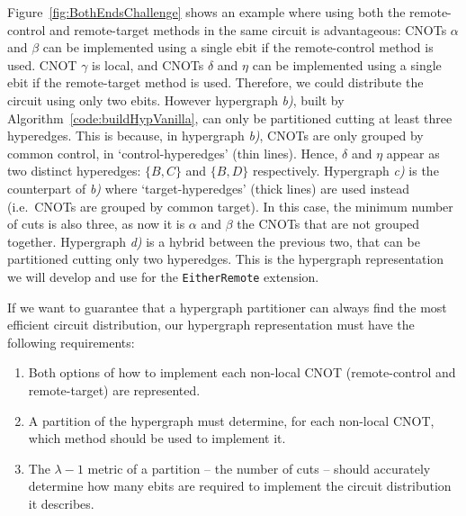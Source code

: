 Figure~\ref{fig:BothEndsChallenge} shows an example where using both the remote-control and remote-target methods in the same circuit is advantageous: CNOTs \(\alpha\) and \(\beta\) can be implemented using a single ebit if the remote-control method is used. CNOT \(\gamma\) is local, and CNOTs \(\delta\) and \(\eta\) can be implemented using a single ebit if the remote-target method is used. Therefore, we could distribute the circuit using only two ebits. However hypergraph \textit{b)}, built by Algorithm~\ref{code:buildHypVanilla}, can only be partitioned cutting at least three hyperedges. This is because, in hypergraph \textit{b)}, CNOTs are only grouped by common control, in `control-hyperedges' (thin lines). Hence, \(\delta\) and \(\eta\) appear as two distinct hyperedges: \(\{B,C\}\) and \(\{B,D\}\) respectively. Hypergraph \textit{c)} is the counterpart of \textit{b)} where `target-hyperedges' (thick lines) are used instead (i.e.\ CNOTs are grouped by common target). In this case, the minimum number of cuts is also three, as now it is \(\alpha\) and \(\beta\) the CNOTs that are not grouped together. Hypergraph \textit{d)} is a hybrid between the previous two, that can be partitioned cutting only two hyperedges. This is the hypergraph representation we will develop and use for the \texttt{EitherRemote} extension.

If we want to guarantee that a hypergraph partitioner can always find the most efficient circuit distribution, our hypergraph representation must have the following requirements:
\begin{enumerate}
  \item Both options of how to implement each non-local CNOT (remote-control and remote-target) are represented.
  \item A partition of the hypergraph must determine, for each non-local CNOT, which method should be used to implement it.
  \item The \(\lambda\!-\!1\) metric of a partition -- the number of cuts -- should accurately determine how many ebits are required to implement the circuit distribution it describes.
\end{enumerate}

